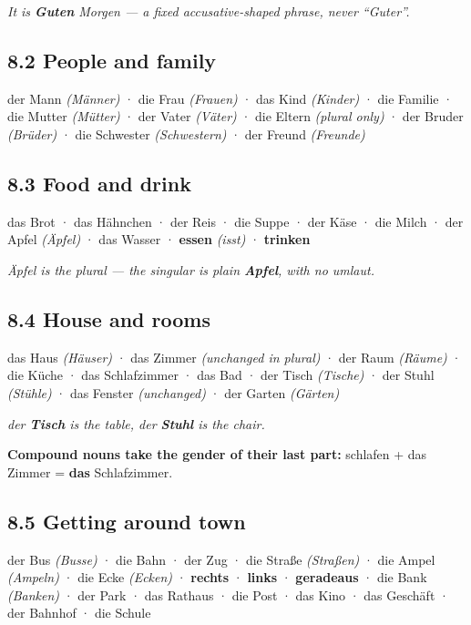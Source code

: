 \documentclass[
  11pt,
]{article}
\begin{document}
\emph{It is \textbf{Guten} Morgen --- a fixed accusative-shaped phrase,
never ``Guter''.}

\subsection{8.2 People and family}\label{people-and-family}

der Mann \emph{(Männer)} · die Frau \emph{(Frauen)} · das Kind
\emph{(Kinder)} · die Familie · die Mutter \emph{(Mütter)} · der Vater
\emph{(Väter)} · die Eltern \emph{(plural only)} · der Bruder
\emph{(Brüder)} · die Schwester \emph{(Schwestern)} · der Freund
\emph{(Freunde)}

\subsection{8.3 Food and drink}\label{food-and-drink}

das Brot · das Hähnchen · der Reis · die Suppe · der Käse · die Milch ·
der Apfel \emph{(Äpfel)} · das Wasser · \textbf{essen} \emph{(isst)} ·
\textbf{trinken}

\emph{Äpfel is the plural --- the singular is plain \textbf{Apfel}, with
no umlaut.}

\subsection{8.4 House and rooms}\label{house-and-rooms}

das Haus \emph{(Häuser)} · das Zimmer \emph{(unchanged in plural)} · der
Raum \emph{(Räume)} · die Küche · das Schlafzimmer · das Bad · der Tisch
\emph{(Tische)} · der Stuhl \emph{(Stühle)} · das Fenster
\emph{(unchanged)} · der Garten \emph{(Gärten)}

\emph{der \textbf{Tisch} is the table, der \textbf{Stuhl} is the chair.}

\textbf{Compound nouns take the gender of their last part:} schlafen +
das Zimmer = \textbf{das} Schlafzimmer.

\subsection{8.5 Getting around town}\label{getting-around-town}

der Bus \emph{(Busse)} · die Bahn · der Zug · die Straße
\emph{(Straßen)} · die Ampel \emph{(Ampeln)} · die Ecke \emph{(Ecken)} ·
\textbf{rechts} · \textbf{links} · \textbf{geradeaus} · die Bank
\emph{(Banken)} · der Park · das Rathaus · die Post · das Kino · das
Geschäft · der Bahnhof · die Schule
\end{document}
